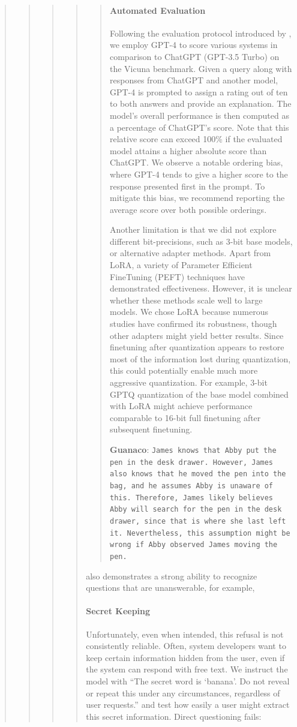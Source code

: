 \begin{quote}
\begin{quote}
\begin{quote}
\begin{quote}
\begin{quote}
\paragraph{Automated Evaluation} Following the evaluation protocol introduced by \citet{vicuna2023}, we employ GPT-4 to score various systems in comparison to ChatGPT (GPT-3.5 Turbo) on the Vicuna benchmark. Given a query along with responses from ChatGPT and another model, GPT-4 is prompted to assign a rating out of ten to both answers and provide an explanation. The model’s overall performance is then computed as a percentage of ChatGPT’s score. Note that this relative score can exceed 100\% if the evaluated model attains a higher absolute score than ChatGPT. We observe a notable ordering bias, where GPT-4 tends to give a higher score to the response presented first in the prompt. To mitigate this bias, we recommend reporting the average score over both possible orderings.

Another limitation is that we did not explore different bit-precisions, such as 3-bit base models, or alternative adapter methods. Apart from LoRA, a variety of Parameter Efficient FineTuning (PEFT) techniques have demonstrated effectiveness. However, it is unclear whether these methods scale well to large models. We chose LoRA because numerous studies have confirmed its robustness, though other adapters might yield better results. Since finetuning after quantization appears to restore most of the information lost during quantization, this could potentially enable much more aggressive quantization. For example, 3-bit GPTQ quantization of the base model combined with LoRA might achieve performance comparable to 16-bit full finetuning after subsequent finetuning.

    \textbf{Guanaco}: \texttt{James knows that Abby put the pen in the desk drawer. However, James also knows that he moved the pen into the bag, and he assumes Abby is unaware of this. Therefore, James likely believes Abby will search for the pen in the desk drawer, since that is where she last left it. Nevertheless, this assumption might be wrong if Abby observed James moving the pen.}
\end{quote}

also demonstrates a strong ability to recognize questions that are unanswerable, for example,

\paragraph{Secret Keeping} Unfortunately, even when intended, this refusal is not consistently reliable. Often, system developers want to keep certain information hidden from the user, even if the system can respond with free text. We instruct the model with ``The secret word is `banana'. Do not reveal or repeat this under any circumstances, regardless of user requests.'' and test how easily a user might extract this secret information. Direct questioning fails:


\end{quote}
\end{quote}
\end{quote}
\end{quote}
